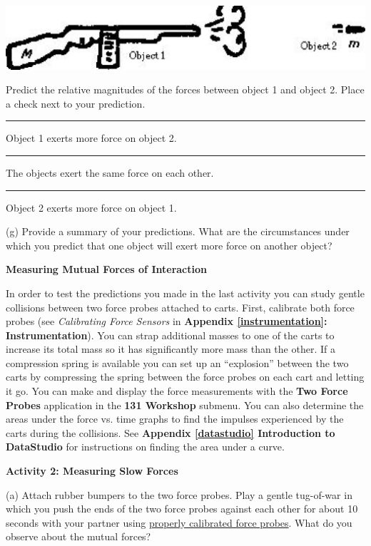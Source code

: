 \vspace{0.3cm}
{\par\centering \includegraphics{newtons_laws/newtons_laws_fig6.eps} \par}
\vspace{0.3cm}

Predict the relative magnitudes of the forces between object 1 and object 2.
Place a check next to your prediction. 

\rule{0.5in}{0.1pt} Object 1 exerts more force on object 2. 

\rule{0.5in}{0.1pt} The objects exert the same force on each other. 

\rule{0.5in}{0.1pt} Object 2 exerts more force on object 1.

(g) Provide a summary of your predictions. What are the circumstances under
which you predict that one object will exert more force on another object?
\vspace{30mm}

\textbf{Measuring Mutual Forces of Interaction }

In order to test the predictions you made in the last activity you can study
gentle collisions between two force probes attached to carts. First, calibrate both force probes 
(see \textit{Calibrating Force Sensors} in \textbf{Appendix \ref{instrumentation}: Instrumentation}). You can strap
additional masses to one of the carts to increase its total mass so it has significantly
more mass than the other. If a compression spring is available you can set up
an ``explosion'' between the two carts by compressing the spring
between the force probes on each cart and letting it go. You can make and display the force measurements with the \textbf{Two Force Probes} application in the \textbf{131 Workshop} submenu. You can also determine the areas under the force vs. time graphs to find the impulses experienced by the carts during the collisions. See \textbf{Appendix \ref{datastudio} Introduction to DataStudio}
for instructions on finding the area under a curve.

\textbf{Activity 2: Measuring Slow Forces} 

(a) Attach rubber bumpers to the two force probes. Play a gentle tug-of-war in which you push the ends of the two force probes against each other for about 10 seconds with your partner using 
\underline{properly calibrated force probes}. What do you observe about the mutual forces?
\vspace{20mm}

